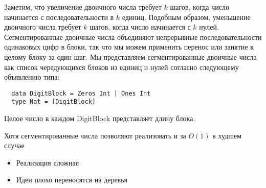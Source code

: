 \begin{frame}[fragile]{}

Заметим, что увеличение двоичного числа требует $k$ шагов, когда число
начинается с последовательности в $k$ единиц. Подобным образом,
уменьшение двоичного числа требует $k$ шагов, когда число начинается
с $k$ нулей. Сегментированные двоичные числа объединяют непрерывные
последовательности одинаковых цифр в блоки, так что мы можем применить
перенос или занятие к целому блоку за один шаг. Мы представляем
сегментированные двоичные числа как список чередующихся блоков из
единиц и нулей согласно следующему объявлению типа:
\begin{verbatim}
  data DigitBlock = Zeros Int | Ones Int
  type Nat = [DigitBlock]
\end{verbatim}
Целое число в каждом DigitBlock представляет длину блока.

\end{frame}

\begin{frame}[fragile]{}
Хотя сегментированные числа позволяют реализовать  и  за 
$O(1)$ в худшем случае
\begin{itemize}
  \item Реализация сложная
  \item Идеи плохо переносятся на деревья
\end{itemize}
\end{frame}

